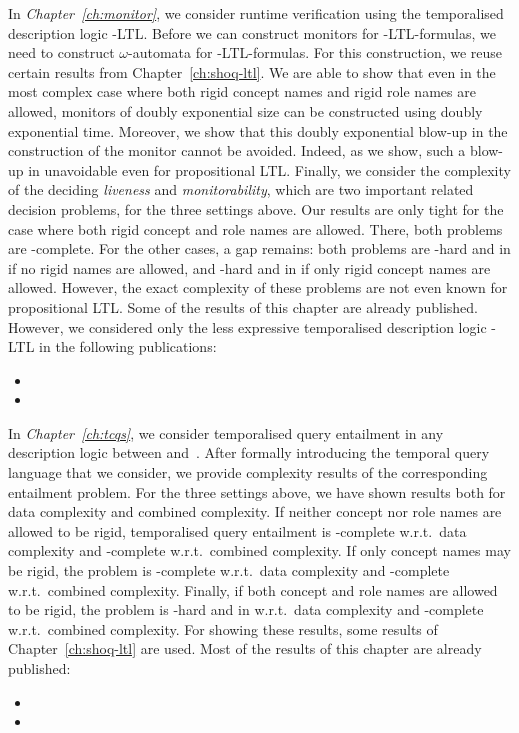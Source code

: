 In \emph{Chapter~\ref{ch:monitor}}, we consider runtime verification using the
temporalised description logic \SHOQ-LTL\@.  Before we can construct monitors
for \SHOQ-LTL-formulas, we need to construct $\omega$-automata for
\SHOQ-LTL-formulas.  For this construction, we reuse certain results from
Chapter~\ref{ch:shoq-ltl}.  We are able to show that even in the most complex
case where both rigid concept names and rigid role names are allowed, monitors
of doubly exponential size can be constructed using doubly exponential time.
Moreover, we show that this doubly exponential blow-up in the construction of
the monitor cannot be avoided.  Indeed, as we show, such a blow-up in
unavoidable even for propositional LTL\@.  Finally, we consider the complexity
of the deciding \emph{liveness} and \emph{monitorability}, which are two
important related decision problems, for the three settings above.  Our results
are only tight for the case where both rigid concept and role names are allowed.
There, both problems are \TwoExpTime-complete.  For the other cases, a gap
remains: both problems are \ExpTime-hard and in \TwoExpTime if no rigid names
are allowed, and \coNExpTime-hard and in \TwoExpTime if only rigid concept names
are allowed.  However, the exact complexity of these problems are not even known
for propositional LTL\@.
%
Some of the results of this chapter are already published.  However, we
considered only the less expressive temporalised description logic \ALC-LTL in
the following publications:
\begin{itemize}
    \item {}
    \item {}
\end{itemize}

In \emph{Chapter~\ref{ch:tcqs}}, we consider temporalised query entailment in
any description logic between \ALC and~\SHQ.  After formally introducing the
temporal query language that we consider, we provide complexity results of the
corresponding entailment problem.  For the three settings above, we have shown
results both for data complexity and combined complexity.  If neither concept
nor role names are allowed to be rigid, temporalised query entailment is
\coNP-complete w.r.t.\ data complexity and \ExpTime-complete w.r.t.\ combined
complexity.  If only concept names may be rigid, the problem is \coNP-complete
w.r.t.\ data complexity and \coNExpTime-complete w.r.t.\ combined complexity.
Finally, if both concept and role names are allowed to be rigid, the problem is
\coNP-hard and in \ExpTime w.r.t.\ data complexity and \TwoExpTime-complete
w.r.t.\ combined complexity.  For showing these results, some results of
Chapter~\ref{ch:shoq-ltl} are used.
%
Most of the results of this chapter are already published:
\begin{itemize}
    \item {}
    \item {}
\end{itemize}

